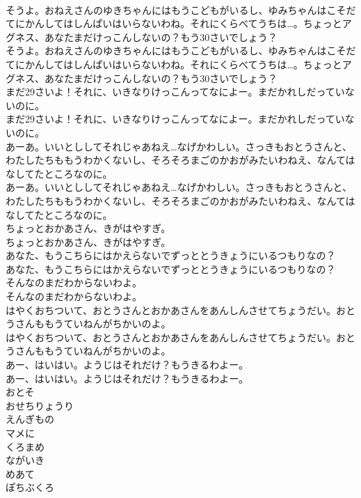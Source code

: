 \documentclass[8pt]{extreport}
\begin{document}
\begin{CJK}{UTF8}{min}
\\	そうよ。おねえさんのゆきちゃんにはもうこどもがいるし、ゆみちゃんはこそだてにかんしてはしんぱいはいらないわね。それにくらべてうちは…。ちょっとアグネス、あなたまだけっこんしないの？もう30さいでしょう？	
\\	そうよ。おねえさんのゆきちゃんにはもうこどもがいるし、ゆみちゃんはこそだてにかんしてはしんぱいはいらないわね。それにくらべてうちは…。ちょっとアグネス、あなたまだけっこんしないの？もう30さいでしょう？ 
\\	まだ29さいよ！それに、いきなりけっこんってなによー。まだかれしだっていないのに。	
\\	まだ29さいよ！それに、いきなりけっこんってなによー。まだかれしだっていないのに。 
\\	あーあ。いいとししてそれじゃあねえ…なげかわしい。さっきもおとうさんと、わたしたちももうわかくないし、そろそろまごのかおがみたいわねえ、なんてはなしてたところなのに。	
\\	あーあ。いいとししてそれじゃあねえ…なげかわしい。さっきもおとうさんと、わたしたちももうわかくないし、そろそろまごのかおがみたいわねえ、なんてはなしてたところなのに。 
\\	ちょっとおかあさん、きがはやすぎ。	
\\	ちょっとおかあさん、きがはやすぎ。 
\\	あなた、もうこちらにはかえらないでずっととうきょうにいるつもりなの？	
\\	あなた、もうこちらにはかえらないでずっととうきょうにいるつもりなの？ 
\\	そんなのまだわからないわよ。	
\\	そんなのまだわからないわよ。 
\\	はやくおちついて、おとうさんとおかあさんをあんしんさせてちょうだい。おとうさんももうていねんがちかいのよ。	
\\	はやくおちついて、おとうさんとおかあさんをあんしんさせてちょうだい。おとうさんももうていねんがちかいのよ。 
\\	あー、はいはい。ようじはそれだけ？もうきるわよー。	
\\	あー、はいはい。ようじはそれだけ？もうきるわよー。 
\\	おとそ
\\	おせちりょうり
\\	えんぎもの
\\	マメに
\\	くろまめ
\\	ながいき
\\	めあて
\\	ぽちぶくろ

\end{CJK}
\end{document}
